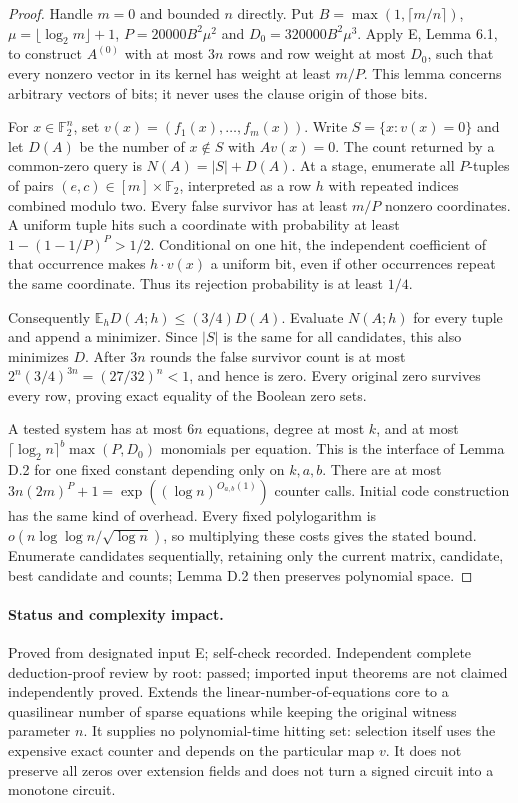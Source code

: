 \begin{proof}
Handle $m=0$ and bounded $n$ directly. Put $B=\max(1,\lceil m/n\rceil)$, $\mu=\lfloor\log_2m\rfloor+1$, $P=20000B^2\mu^2$ and $D_0=320000B^2\mu^3$. Apply E, Lemma 6.1, to construct $A^{(0)}$ with at most $3n$ rows and row weight at most $D_0$, such that every nonzero vector in its kernel has weight at least $m/P$. This lemma concerns arbitrary vectors of bits; it never uses the clause origin of those bits.

For $x\in\mathbb F_2^n$, set $v(x)=(f_1(x),\ldots,f_m(x))$. Write $S=\{x:v(x)=0\}$ and let $D(A)$ be the number of $x\notin S$ with $Av(x)=0$. The count returned by a common-zero query is $N(A)=|S|+D(A)$. At a stage, enumerate all $P$-tuples of pairs $(e,c)\in[m]\times\mathbb F_2$, interpreted as a row $h$ with repeated indices combined modulo two. Every false survivor has at least $m/P$ nonzero coordinates. A uniform tuple hits such a coordinate with probability at least $1-(1-1/P)^P>1/2$. Conditional on one hit, the independent coefficient of that occurrence makes $h\cdot v(x)$ a uniform bit, even if other occurrences repeat the same coordinate. Thus its rejection probability is at least $1/4$.

Consequently $\mathbb E_hD(A;h)\leq(3/4)D(A)$. Evaluate $N(A;h)$ for every tuple and append a minimizer. Since $|S|$ is the same for all candidates, this also minimizes $D$. After $3n$ rounds the false survivor count is at most $2^n(3/4)^{3n}=(27/32)^n<1$, and hence is zero. Every original zero survives every row, proving exact equality of the Boolean zero sets.

A tested system has at most $6n$ equations, degree at most $k$, and at most $\lceil\log_2n\rceil^b\max(P,D_0)$ monomials per equation. This is the interface of Lemma D.2 for one fixed constant depending only on $k,a,b$. There are at most $3n(2m)^P+1=\exp((\log n)^{O_{a,b}(1)})$ counter calls. Initial code construction has the same kind of overhead. Every fixed polylogarithm is $o(n\log\log n/\sqrt{\log n})$, so multiplying these costs gives the stated bound. Enumerate candidates sequentially, retaining only the current matrix, candidate, best candidate and counts; Lemma D.2 then preserves polynomial space.
\end{proof}
\paragraph{Status and complexity impact.}
Proved from designated input E; self-check recorded. Independent complete deduction-proof review by root: passed; imported input theorems are not claimed independently proved. Extends the linear-number-of-equations core to a quasilinear number of sparse equations while keeping the original witness parameter $n$. It supplies no polynomial-time hitting set: selection itself uses the expensive exact counter and depends on the particular map $v$. It does not preserve all zeros over extension fields and does not turn a signed circuit into a monotone circuit.

